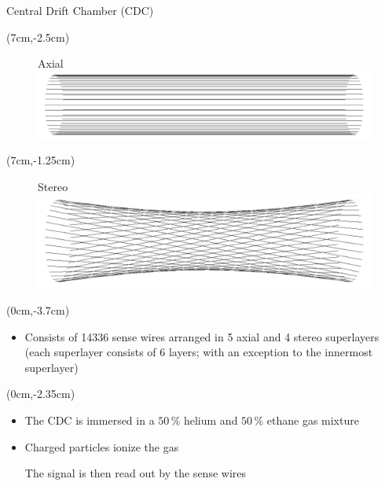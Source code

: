 \documentclass[8pt]{beamer}
\begin{document}
\begin{frame}{Central Drift Chamber (CDC)}

	\begin{textblock*}{4cm}(7cm,-2.5cm)
		\begin{figure}
			Axial
			\includegraphics[width=\textwidth]{VBilder/axial}
		\end{figure}
	\end{textblock*}

	\begin{textblock*}{4cm}(7cm,-1.25cm)
		
		\begin{figure}
			Stereo
			\includegraphics[width=\textwidth]{VBilder/stereo}
		\end{figure}
	\end{textblock*}




	\begin{textblock*}{10cm}(0cm,-3.7cm)
	
		
		\begin{itemize}
			\item Consists of 14336 sense wires arranged in 5 axial and 4 stereo superlayers (each superlayer consists of 6 layers; with an exception to the innermost superlayer)
		\end{itemize}
		\end{textblock*}
		\begin{textblock*}{6.5cm}(0cm,-2.35cm)
		
		\begin{itemize}
			\item The CDC is immersed in a $50\,\%$ helium and $50\,\%$ ethane gas mixture
			\item Charged particles ionize the gas
			
			The signal is then read out by the sense wires  
			


\end{itemize}
\end{textblock*}
\end{frame}
\end{document}
